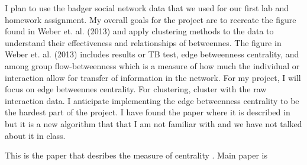 \documentclass[11pt]{article}
\begin{document}
\indent I plan to use the badger social network data that we used for our first lab and homework assignment.  My overall goals for the project are to recreate the figure found in Weber et. al. (2013) and apply clustering methods to the data to understand their effectiveness and relationships of betweennes.  The figure in Weber et. al. (2013) includes results or TB test, edge betweenness centrality, and among group flow-betweenness which is a measure of how much the individual or interaction allow for transfer of information in the network.  For my project, I will focus on edge betweennes centrality.  For clustering, cluster with the raw interaction data.  I anticipate implementing the edge betweenness centrality to be the hardest part of the project.  I have found the paper where it is described in but it is a new algorithm that that I am not familiar with and we have not talked about it in class.




This is the paper that desribes the measure of centrality \cite{freeman-1991}.  Main paper is \cite{weber-2013}


\end{document}

